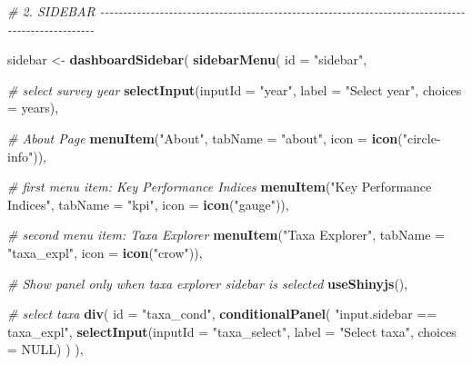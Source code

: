 \documentclass[
]{book}
\newenvironment{Shaded}{\begin{snugshade}}{\end{snugshade}}
\newcommand{\AttributeTok}[1]{\textcolor[rgb]{0.13,0.29,0.53}{#1}}
\newcommand{\CommentTok}[1]{\textcolor[rgb]{0.56,0.35,0.01}{\textit{#1}}}
\newcommand{\ConstantTok}[1]{\textcolor[rgb]{0.56,0.35,0.01}{#1}}
\newcommand{\FunctionTok}[1]{\textcolor[rgb]{0.13,0.29,0.53}{\textbf{#1}}}
\newcommand{\NormalTok}[1]{#1}
\newcommand{\OtherTok}[1]{\textcolor[rgb]{0.56,0.35,0.01}{#1}}
\newcommand{\StringTok}[1]{\textcolor[rgb]{0.31,0.60,0.02}{#1}}
\begin{document}
\begin{Shaded}
\begin{Highlighting}[]
\CommentTok{\# 2. SIDEBAR {-}{-}{-}{-}{-}{-}{-}{-}{-}{-}{-}{-}{-}{-}{-}{-}{-}{-}{-}{-}{-}{-}{-}{-}{-}{-}{-}{-}{-}{-}{-}{-}{-}{-}{-}{-}{-}{-}{-}{-}{-}{-}{-}{-}{-}{-}{-}{-}{-}{-}{-}{-}{-}{-}{-}{-}{-}{-}{-}{-}{-}{-}{-}{-}{-}{-}{-}{-}{-}{-}{-}{-}{-}{-}{-}{-}{-}{-}{-}{-}{-}{-}{-}{-}{-}{-}{-}{-}{-}{-}{-}{-}{-}{-}{-}{-}{-}{-}{-}}

\NormalTok{sidebar }\OtherTok{\textless{}{-}} \FunctionTok{dashboardSidebar}\NormalTok{(}
  \FunctionTok{sidebarMenu}\NormalTok{(}
    \AttributeTok{id =} \StringTok{"sidebar"}\NormalTok{,}
    
    \CommentTok{\# select survey year}
    \FunctionTok{selectInput}\NormalTok{(}\AttributeTok{inputId =} \StringTok{"year"}\NormalTok{, }\AttributeTok{label =} \StringTok{"Select year"}\NormalTok{, }\AttributeTok{choices =}\NormalTok{ years),}
    
    \CommentTok{\# About Page}
    \FunctionTok{menuItem}\NormalTok{(}\StringTok{"About"}\NormalTok{, }\AttributeTok{tabName =} \StringTok{"about"}\NormalTok{, }\AttributeTok{icon =} \FunctionTok{icon}\NormalTok{(}\StringTok{"circle{-}info"}\NormalTok{)),}
    
    \CommentTok{\# first menu item: Key Performance Indices}
    \FunctionTok{menuItem}\NormalTok{(}\StringTok{"Key Performance Indices"}\NormalTok{, }\AttributeTok{tabName =} \StringTok{"kpi"}\NormalTok{, }\AttributeTok{icon =} \FunctionTok{icon}\NormalTok{(}\StringTok{"gauge"}\NormalTok{)),}
    
    \CommentTok{\# second menu item: Taxa Explorer}
    \FunctionTok{menuItem}\NormalTok{(}\StringTok{"Taxa Explorer"}\NormalTok{, }\AttributeTok{tabName =} \StringTok{"taxa\_expl"}\NormalTok{, }\AttributeTok{icon =} \FunctionTok{icon}\NormalTok{(}\StringTok{"crow"}\NormalTok{)),}
    
    \CommentTok{\# Show panel only when taxa explorer sidebar is selected}
    \FunctionTok{useShinyjs}\NormalTok{(),}
    
    \CommentTok{\# select taxa}
    \FunctionTok{div}\NormalTok{(}
      \AttributeTok{id =} \StringTok{"taxa\_cond"}\NormalTok{,}
      \FunctionTok{conditionalPanel}\NormalTok{(}
        \StringTok{"input.sidebar == \textquotesingle{}taxa\_expl\textquotesingle{}"}\NormalTok{,}
        \FunctionTok{selectInput}\NormalTok{(}\AttributeTok{inputId =} \StringTok{"taxa\_select"}\NormalTok{, }\AttributeTok{label =} \StringTok{"Select taxa"}\NormalTok{, }\AttributeTok{choices =} \ConstantTok{NULL}\NormalTok{)}
\NormalTok{      )}
\NormalTok{    ),}
    

\end{Highlighting}
\end{Shaded}
\end{document}
